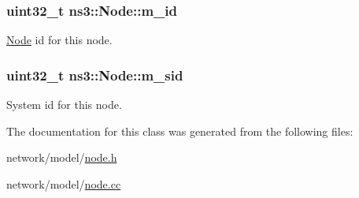 \subsubsection[{\texorpdfstring{m\+\_\+id}{m_id}}]{\setlength{\rightskip}{0pt plus 5cm}uint32\+\_\+t ns3\+::\+Node\+::m\+\_\+id\hspace{0.3cm}{\ttfamily [private]}}\hypertarget{classns3_1_1Node_a4aedbd7c03591acdcf48a4f79818dba1}{}\label{classns3_1_1Node_a4aedbd7c03591acdcf48a4f79818dba1}


\hyperlink{classns3_1_1Node}{Node} id for this node. 

\subsubsection[{\texorpdfstring{m\+\_\+sid}{m_sid}}]{\setlength{\rightskip}{0pt plus 5cm}uint32\+\_\+t ns3\+::\+Node\+::m\+\_\+sid\hspace{0.3cm}{\ttfamily [private]}}\hypertarget{classns3_1_1Node_aa6c9e7e8168f6da55df608b5a884b112}{}\label{classns3_1_1Node_aa6c9e7e8168f6da55df608b5a884b112}


System id for this node. 



The documentation for this class was generated from the following files\+:\begin{DoxyCompactItemize}
\item 
network/model/\hyperlink{node_8h}{node.\+h}\item 
network/model/\hyperlink{node_8cc}{node.\+cc}\end{DoxyCompactItemize}
